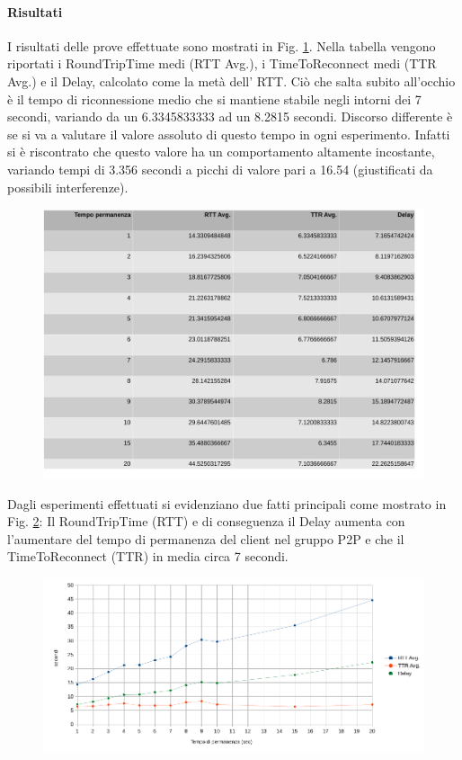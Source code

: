 \documentclass{llncs}
\begin{document}
\paragraph{Risultati} I risultati delle prove effettuate sono mostrati in Fig. \ref{report}. Nella tabella vengono riportati i RoundTripTime medi (RTT Avg.), i TimeToReconnect medi (TTR Avg.) e il Delay, calcolato come la metà dell' RTT. Ciò che salta subito all'occhio è il tempo di riconnessione medio che si mantiene stabile negli intorni dei 7 secondi, variando da un 6.3345833333 ad un 8.2815 secondi. Discorso differente è se si va a valutare il valore assoluto di questo tempo in ogni esperimento. Infatti si è riscontrato che questo valore ha un comportamento altamente incostante, variando tempi di 3.356 secondi a picchi di valore pari a 16.54 (giustificati da possibili interferenze). 
\begin{figure}[H]
	\includegraphics[scale=0.3,center]{img/report.png}
	\caption{}
	\label{report}
\end{figure}
\noindent
Dagli esperimenti effettuati si evidenziano due fatti principali come mostrato in Fig. \ref{rtt}: Il RoundTripTime (RTT) e di conseguenza il Delay aumenta con l'aumentare del tempo di permanenza del client nel gruppo P2P e che il TimeToReconnect (TTR) in media circa 7 secondi.
\begin{figure}[H]
	\includegraphics[scale=0.5,center]{img/rtt.png}
	\caption{}
	\label{rtt}
\end{figure}
\noindent
	
\end{document}
